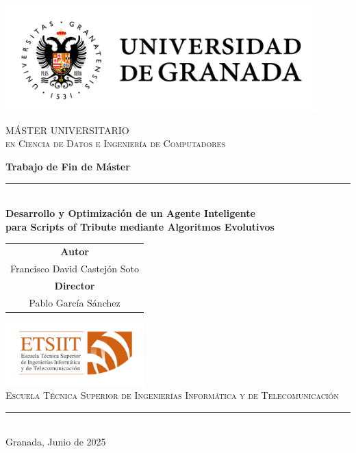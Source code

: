 \begin{titlepage}
	\thispagestyle{empty}

	\centering
	\includegraphics[width=0.9\textwidth]{logos/logo_ugr.jpg}
	\vspace{1.0cm}

	{\rmfamily\textsc{\Large MÁSTER UNIVERSITARIO}}\\[0.2cm]
	{\rmfamily\textsc{\large en Ciencia de Datos e Ingeniería de Computadores}}
	\vspace{1.5cm}

	\vfill

	{\Huge\bfseries Trabajo de Fin de Máster}\\[0.5cm]
	\rule{\textwidth}{3pt}\\[0.5cm]
	{\Large\bfseries Desarrollo y Optimización de un Agente Inteligente \\
	para Scripts of Tribute mediante Algoritmos Evolutivos}
	\vspace{1.5cm}

	\vfill

	\begin{tabular}{@{}c@{}}
		\textbf{\large Autor}         \\[0.3cm]
		Francisco David Castejón Soto \\[1cm]
		\textbf{\large Director}      \\[0.3cm]
		Pablo García Sánchez
	\end{tabular}

	\vfill

	\includegraphics[width=0.4\textwidth]{logos/etsiit_logo.png}\\[0.3cm]
	{\rmfamily\textsc{\footnotesize Escuela Técnica Superior de Ingenierías Informática y de Telecomunicación}}\\
	\rule{0.1\textwidth}{0.5pt}\\[0.3cm]
	{\large Granada, Junio de 2025}

\end{titlepage}